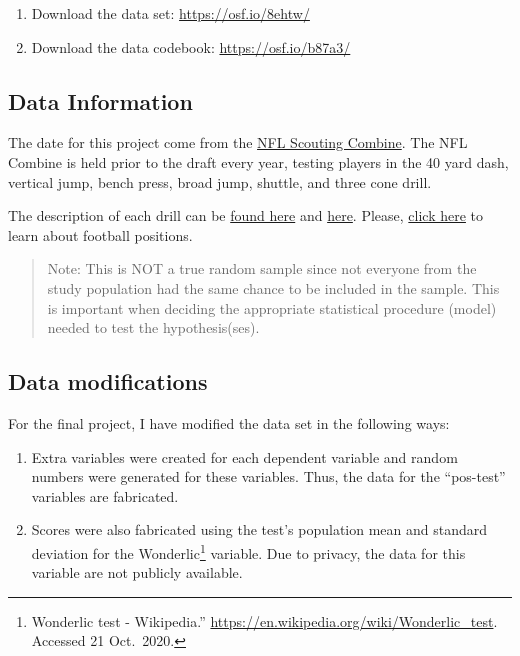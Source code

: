 \documentclass[
]{article}
\providecommand{\tightlist}{%
  \setlength{\itemsep}{0pt}\setlength{\parskip}{0pt}}
\begin{document}
\begin{enumerate}
\def\labelenumi{\arabic{enumi}.}
\tightlist
\item
  Download the data set: \url{https://osf.io/8ehtw/}
\item
  Download the data codebook: \url{https://osf.io/b87a3/}
\end{enumerate}

\hypertarget{data-info}{%
\subsection{Data Information}\label{data-info}}

The date for this project come from the \href{https://en.wikipedia.org/wiki/NFL_Scouting_Combine}{NFL Scouting Combine}. The NFL Combine is held prior to the draft every year, testing players in the 40 yard dash, vertical jump, bench press, broad jump, shuttle, and three cone drill.

The description of each drill can be \href{https://nflcombineresults.com/nfl-combine-drills-101-what-each-drill-measures/}{found here} and \href{https://www.espn.com/nfl/draft2018/story/_/id/22587931/guide-nfl-draft-combine-drills-todd-mcshay-numbers-know-40-yard-dash-short-shuttle-bench-press}{here}. Please, \href{https://protips.dickssportinggoods.com/sports-and-activities/football/football-101-football-positions-and-their-roles}{click here} to learn about football positions.

\begin{quote}
Note: This is NOT a true random sample since not everyone from the study population had the same chance to be included in the sample. This is important when deciding the appropriate statistical procedure (model) needed to test the hypothesis(ses).
\end{quote}

\hypertarget{data-modifications}{%
\subsection{Data modifications}\label{data-modifications}}

For the final project, I have modified the data set in the following ways:

\begin{enumerate}
\def\labelenumi{\arabic{enumi}.}
\item
  Extra variables were created for each dependent variable and random numbers were generated for these variables. Thus, the data for the ``pos-test'' variables are fabricated.
\item
  Scores were also fabricated using the test's population mean and standard deviation for the Wonderlic\footnote{Wonderlic test - Wikipedia.'' \url{https://en.wikipedia.org/wiki/Wonderlic_test}. Accessed 21 Oct.~2020.} variable. Due to privacy, the data for this variable are not publicly available.
\end{enumerate}
\end{document}
